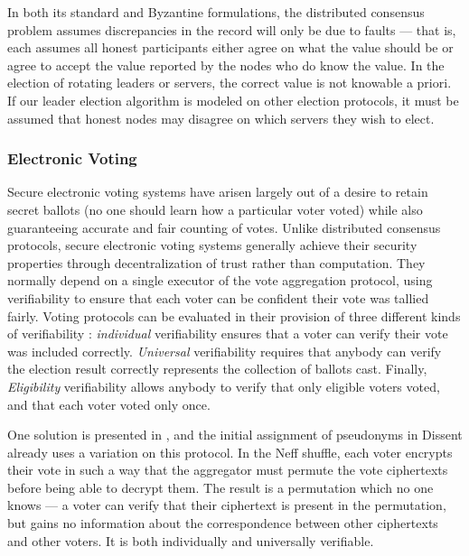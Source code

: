     In both its standard and Byzantine formulations, the distributed consensus
    problem assumes discrepancies in the record will only be due to faults ---
    that is, each assumes all honest participants either agree on what the value
    should be or agree to accept the value reported by the nodes who do know the
    value.  In the election of rotating leaders or servers, the correct value is
    not knowable a priori. If our leader election algorithm is modeled on other
    election protocols, it must be assumed that honest nodes may disagree on
    which servers they wish to elect.

  \subsubsection{Electronic Voting}
    Secure electronic voting systems have arisen largely out of a desire to
    retain secret ballots (no one should learn how a particular voter voted)
    while also guaranteeing accurate and fair counting of votes. Unlike
    distributed consensus protocols, secure electronic voting systems generally
    achieve their security properties through decentralization of trust rather
    than computation. They normally depend on a single executor of the vote
    aggregation protocol, using verifiability to ensure that each voter can be
    confident their vote was tallied fairly. Voting protocols can be evaluated
    in their provision of three different kinds of verifiability
    \cite{kremer_election_2010}: \emph{individual} verifiability ensures that a
    voter can verify their vote was included correctly. \emph{Universal}
    verifiability requires that anybody can verify the election result correctly
    represents the collection of ballots cast. Finally, \emph{Eligibility}
    verifiability allows anybody to verify that only eligible voters voted, and
    that each voter voted only once.

    One solution is presented in \cite{neff_verifiable_2001},
    and the initial assignment of pseudonyms in Dissent already uses a variation
    on this protocol. In the Neff shuffle, each voter encrypts their vote in
    such a way that the aggregator must permute the vote ciphertexts before
    being able to decrypt them. The result is a permutation which no one knows
    --- a voter can verify that their ciphertext is present in the permutation,
    but gains no information about the correspondence between other ciphertexts
    and other voters. It is both individually and universally verifiable.

